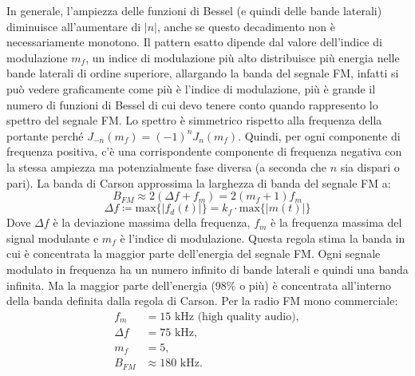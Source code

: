 In generale, l'ampiezza delle funzioni di Bessel (e quindi delle bande laterali) diminuisce all'aumentare di \( |n| \), anche se questo decadimento non è necessariamente monotono.
Il pattern esatto dipende dal valore dell'indice di modulazione \( m_f \), un indice di modulazione più alto distribuisce più energia nelle bande laterali di ordine superiore, allargando la banda del segnale FM,
infatti si può vedere graficamente come più è l'indice di modulazione, più è grande il numero di funzioni di Bessel di cui devo tenere conto quando rappresento lo spettro del segnale FM.
Lo spettro è simmetrico rispetto alla frequenza della portante perché \( J_{-n}(m_f) = (-1)^n J_n(m_f) \). Quindi, per ogni componente di frequenza positiva, c'è una corrispondente componente di frequenza negativa con la stessa ampiezza ma potenzialmente fase diversa (a seconda che \( n \) sia dispari o pari).
La banda di Carson approssima la larghezza di banda del segnale FM a:
\[
    B_{FM} \approx 2(\Delta f + f_{m}) = 2(m_f + 1) f_{m}
\]
\[
    \Delta f \coloneqq \text{max} \{ | f_d(t) | \} = k_f \cdot \text{max} \{ | m(t) | \}
\]
Dove \( \Delta f \) è la deviazione massima della frequenza, \( f_{m} \) è la frequenza massima del signal modulante e \( m_f \) è l'indice di modulazione.
Questa regola stima la banda in cui è concentrata la maggior parte dell'energia del segnale FM.
Ogni segnale modulato in frequenza ha un numero infinito di bande laterali e quindi una banda infinita. Ma la maggior parte dell'energia (98\% o più) è concentrata all'interno della banda definita dalla regola di Carson. Per la radio FM mono commerciale:
\begin{align*}
f_m &= 15 \text{ kHz (high quality audio)}, \\
\Delta f &= 75 \text{ kHz}, \\
m_f &= 5, \\
B_{FM} &\approx 180 \text{ kHz}.
\end{align*}


